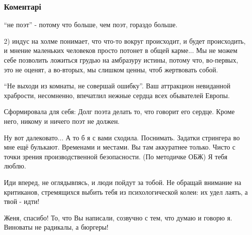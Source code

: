  
 
 
 
 
\subsubsection{Коментарі}
\label{sec:15_10_2018.fb.bilchenko_evgenia.1.pokrova_futljary.cmt}

\begin{itemize}

\enquote{не поэт} - потому что больше, чем поэт, гораздо больше.

2) индус на холме понимает, что что-то вокруг происходит, и будет происходить,
и мнение маленьких человеков просто потонет в общей карме... Мы не можем себе
позволить ложиться грудью на амбразуру истины, потому что, во-первых, это не
оценят, а во-вторых, мы слишком ценны, чтоб жертвовать собой.


\enquote{Не выходи из комнаты, не совершай ошибку}. Ваш аттракцион невиданной
храбрости, несомненно, впечатлил нежные сердца всех обывателей Европы.


Сформировала для себя:
Долг поэта делать то, что говорит его сердце. Кроме него, никому и ничего поэт не должен.


Ну вот далековато... А то б я с вами сходила. Поснимать. Задатки стрингера во
мне ещё булькают. Временами и местами. Вы там аккуратнее только. Чисто с точки
зрения производственной безопасности. (По методичке ОБЖ) Я тебя люблю.


Иди вперед, не оглядывпясь, и люди пойдут за тобой. Не обращай внимание на
критиканов, стремящихся выбить тебя из психологической колеи: их удел лаять, а
твой - идти!


Женя, спасибо! То, что Вы написали, созвучно с тем, что думаю и говорю я.
Виноваты не радикалы, а бюргеры!


\end{itemize}
